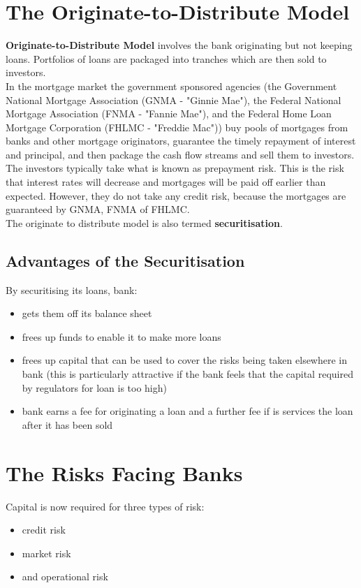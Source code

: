 \section{The Originate-to-Distribute Model}
\textbf{\color{blue}Originate-to-Distribute Model} involves the bank originating but not keeping loans. Portfolios of loans are packaged into tranches which are then sold to investors.\\
In the mortgage market the government sponsored agencies (the Government National Mortgage Association (GNMA - "Ginnie Mae"), the Federal National Mortgage Association (FNMA - "Fannie Mae"), and the Federal Home Loan Mortgage Corporation (FHLMC - "Freddie Mac")) buy pools of mortgages from banks and other mortgage originators, guarantee the timely repayment of interest and principal, and then package the cash flow streams and sell them to investors.\\
The investors typically take what is known as prepayment risk. This is the risk that interest rates will decrease and mortgages will be paid off earlier than expected. However, they do not take any credit risk, because the mortgages are guaranteed by GNMA, FNMA of FHLMC.\\
The originate to distribute model is also termed \textbf{\color{blue}securitisation}.

\subsection{Advantages of the Securitisation}
By securitising its loans, bank:
\begin{itemize}
	\item gets them off its balance sheet
	\item frees up funds to enable it to make more loans
	\item frees up capital that can be used to cover the risks being taken elsewhere in bank (this is particularly attractive if the bank feels that the capital required by regulators for loan is too high)
	\item bank earns a fee for originating a loan and a further fee if is services the loan after it has been sold
\end{itemize}

\section{The Risks Facing Banks}
Capital is now required for three types of risk:
\begin{itemize}
	\item credit risk
	\item market risk
	\item and operational risk
\end{itemize}


